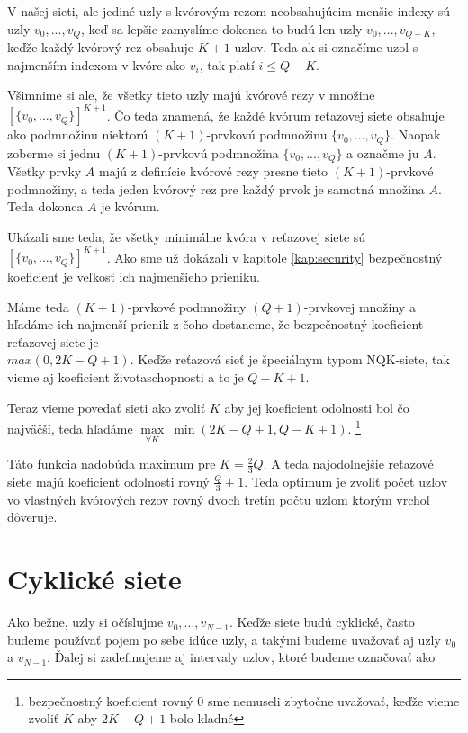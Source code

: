 V našej sieti, ale jediné uzly s kvórovým rezom neobsahujúcim menšie indexy
sú uzly $v_0, ..., v_{Q}$, keď sa lepšie zamyslíme dokonca to budú len uzly
$v_0, ..., v_{Q-K}$, keďže každý kvórový rez obsahuje $K+1$ uzlov.
Teda ak si označíme uzol s najmenším indexom v kvóre ako $v_i$, tak platí
$i\leq Q-K$.

Všimnime si ale, že všetky tieto uzly majú kvórové rezy v množine $[\{v_0, ..., v_Q\}]^{K+1}$.
Čo teda znamená, že každé kvórum reťazovej siete obsahuje ako podmnožinu
niektorú $(K+1)$-prvkovú podmnožinu $\{v_0, ..., v_Q\}$.
Naopak zoberme si jednu $(K+1)$-prvkovú podmnožina $\{v_0, ..., v_Q\}$ a označme ju $A$.
Všetky prvky $A$ majú z definície kvórové rezy presne tieto $(K+1)$-prvkové podmnožiny,
a teda jeden kvórový rez pre každý prvok je samotná množina $A$. Teda dokonca $A$
je kvórum.

Ukázali sme teda, že všetky minimálne kvóra v reťazovej siete sú $[\{v_0, ..., v_Q\}]^{K+1}$.
Ako sme už dokázali v kapitole \ref{kap:security} bezpečnostný koeficient je
veľkosť ich najmenšieho prieniku.

Máme teda $(K+1)$-prvkové podmnožiny $(Q+1)$-prvkovej množiny a hľadáme ich
najmenší prienik z čoho dostaneme, že bezpečnostný koeficient
reťazovej siete je\\ $max (0,2K-Q+1)$.
Keďže reťazová sieť je špeciálnym typom NQK-siete, tak vieme aj
koeficient životaschopnosti a to je $Q-K+1$.

Teraz vieme povedať sieti ako zvoliť $K$ aby jej koeficient odolnosti bol
čo najväčší, teda hľadáme $\max\limits_{\forall K} \: \min (2K-Q+1, Q-K+1)$.
\footnote{bezpečnostný koeficient rovný 0 sme nemuseli zbytočne uvažovať,
keďže vieme zvoliť $K$ aby $2K-Q+1$ bolo kladné}

Táto funkcia nadobúda maximum pre $K = \frac{2}{3}Q$. A teda najodolnejšie
reťazové siete majú koeficient odolnosti rovný $\frac{Q}{3}+1$.
Teda optimum je zvoliť počet uzlov vo vlastných kvórových rezov rovný dvoch
tretín počtu uzlom ktorým vrchol dôveruje.

\section {Cyklické siete}

Ako bežne, uzly si očíslujme $v_0, ..., v_{N-1}$.
Keďže siete budú cyklické, často budeme používať pojem po sebe idúce uzly,
a takými budeme uvažovať aj uzly $v_0$ a $v_{N-1}$.
Ďalej si zadefinujeme aj intervaly uzlov, ktoré budeme označovať ako

